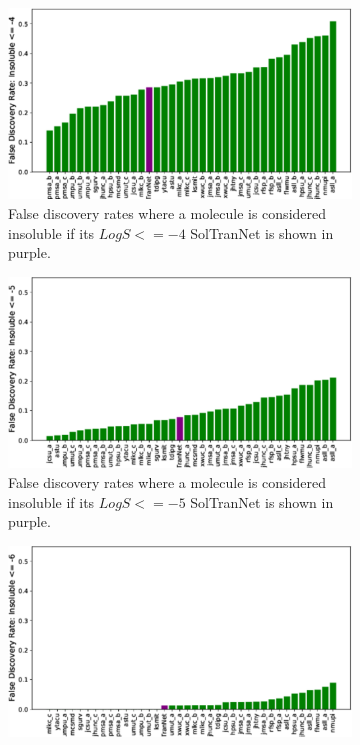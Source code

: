 \documentclass[journal=jmcmar,manuscript=article]{achemso}
\begin{document}
\begin{figure}[tb]
    \begin{subfigure}[t]{0.32\textwidth}
        \centering
        \includegraphics[width=\linewidth]{figures/fail_-4_solchal2.pdf}
        \caption{False discovery rates where a molecule is considered insoluble if its $LogS <=-4$ SolTranNet is shown in purple.}
    \end{subfigure}%
    \hfill
    \begin{subfigure}[t]{0.32\textwidth}
        \centering
        \includegraphics[width=\linewidth]{figures/fail_-5_solchal2.pdf}
        \caption{False discovery rates where a molecule is considered insoluble if its $LogS <=-5$ SolTranNet is shown in purple.}
    \end{subfigure}
    \hfill
    \begin{subfigure}[t]{0.32\textwidth}
        \centering
        \includegraphics[width=\linewidth]{figures/fail_-6_solchal2.pdf}

\end{subfigure}
\end{figure}
\end{document}

